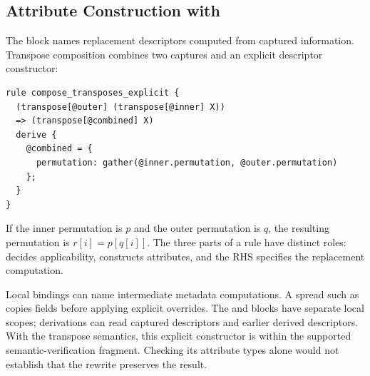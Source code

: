 \FloatBarrier
\subsection{Attribute Construction with \texorpdfstring{}{derive}}
The  block names replacement descriptors computed from captured
information. Transpose composition combines two captures and an explicit
descriptor constructor:
\begin{codeblock}[H]
\begin{lstlisting}[language=TEPL]
rule compose_transposes_explicit {
  (transpose[@outer] (transpose[@inner] X))
  => (transpose[@combined] X)
  derive {
    @combined = {
      permutation: gather(@inner.permutation, @outer.permutation)
    };
  }
}
\end{lstlisting}
\end{codeblock}
If the inner permutation is $p$ and the outer permutation is $q$, the resulting
permutation is $r[i]=p[q[i]]$. The three parts of a rule have distinct roles:
 decides applicability,  constructs attributes, and
the RHS specifies the replacement computation.

Local bindings can name intermediate metadata computations. A spread such as
 copies fields before applying
explicit overrides. The  and  blocks have separate
local scopes; derivations can read captured descriptors and earlier derived
descriptors. With the transpose semantics, this explicit constructor is within
the supported semantic-verification fragment. Checking its attribute types
alone would not establish that the rewrite preserves the result.

\FloatBarrier
